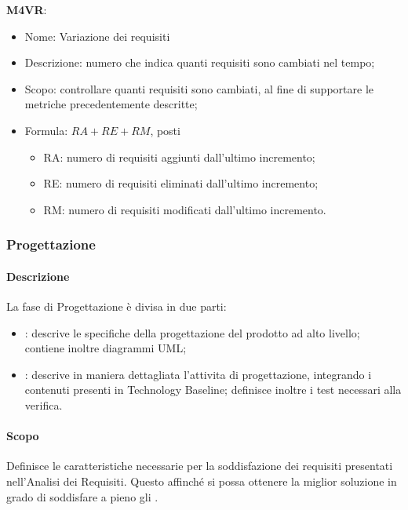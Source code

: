 \textbf{M4VR}:
\begin{itemize}
  \item Nome: Variazione dei requisiti
  \item Descrizione: numero che indica quanti requisiti sono cambiati nel tempo;
  \item Scopo: controllare quanti requisiti sono cambiati, al fine di supportare le metriche precedentemente descritte;
  \item Formula: $ RA + RE + RM $, posti
    \begin{itemize}
      \item RA: numero di requisiti aggiunti dall'ultimo incremento;
      \item RE: numero di requisiti eliminati dall'ultimo incremento;
      \item RM: numero di requisiti modificati dall'ultimo incremento.
    \end{itemize}
\end{itemize}

\subsubsection{Progettazione} 
\paragraph{Descrizione} \hfill \break
La fase di Progettazione è divisa in due parti:
    \begin{itemize}
        \item \textbf{}: descrive le specifiche della progettazione del prodotto ad alto livello; contiene inoltre diagrammi UML;
        \item \textbf{}: descrive in maniera dettagliata l'attivita di progettazione, integrando i contenuti presenti in Technology Baseline; definisce inoltre i test necessari alla verifica.
    \end{itemize} 	

\paragraph{Scopo} \hfill \break
Definisce le caratteristiche necessarie per la soddisfazione dei requisiti presentati nell'Analisi dei Requisiti.
  Questo affinché si possa ottenere la miglior soluzione in grado di soddisfare a pieno gli .\\
     
